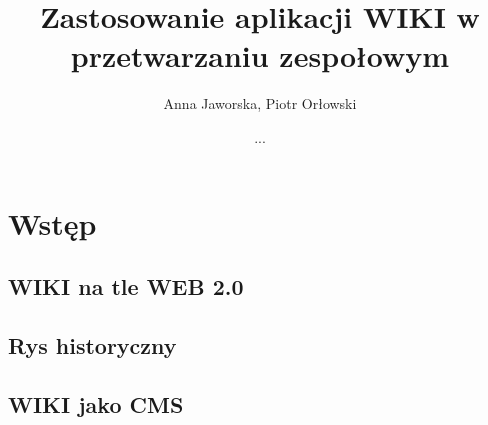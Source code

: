 \documentclass{article}
\title{Zastosowanie aplikacji WIKI w przetwarzaniu zespołowym}
\author{Anna Jaworska, Piotr Orłowski}
\date{...}
\begin{document}
\maketitle
\tableofcontents

\section{Wstęp}
	\subsection {WIKI na tle WEB 2.0}


	\subsection{Rys historyczny}

	\subsection{WIKI jako CMS}

\end{document}
